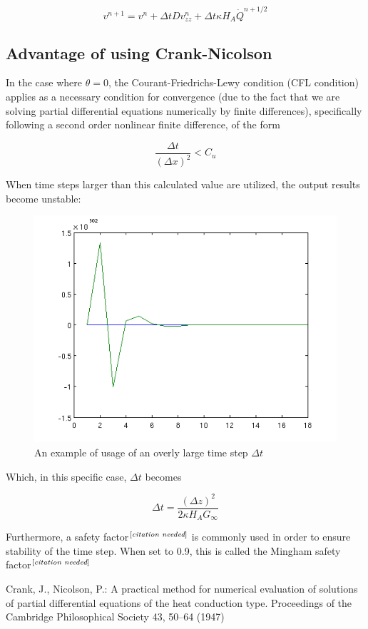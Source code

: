 \documentclass[12pt,letterpaper]{article}
\newcommand{\cn}[0]{^{\left[\emph{citation needed}\right]}}
\begin{document}
\[ v^{n+1} = v^n + \Delta t D v_{zz}^n + \Delta t \kappa H_A \dot{Q}^{n+1/2} \]

\subsection{Advantage of using Crank-Nicolson}
In the case where $\theta = 0$, the Courant-Friedrichs-Lewy condition (CFL condition)
applies as a necessary condition for convergence (due to the fact that we are solving
partial differential equations numerically by finite differences), specifically following
a second order nonlinear finite difference, of the form

\[ \frac{\Delta t}{(\Delta x)^2} < C_u \]

When time steps larger than this calculated value are utilized, the output results
become unstable:
\begin{figure}[H]
	\centering
	\includegraphics[scale=1]{unstable.png}
	\caption{An example of usage of an overly large time step $\Delta t$}
\end{figure}

Which, in this specific case, $\Delta t$ becomes

\[ \Delta t = \frac{(\Delta z)^2}{ 2 \kappa H_A G_{\infty}} \]

Furthermore, a safety factor$\cn$ is commonly used in order to ensure stability of
the time step. When set to 0.9, this is called the Mingham safety factor$\cn$
\begin{thebibliography}{1}
 Crank, J., Nicolson, P.: A practical method for numerical evaluation
of solutions of partial differential equations of the heat conduction type. 
Proceedings of the Cambridge Philosophical Society 43, 50–64 (1947)
\end{thebibliography}
\end{document}
